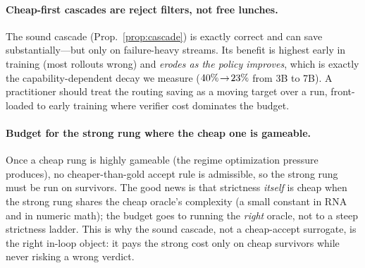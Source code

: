\paragraph{Cheap-first cascades are reject filters, not free lunches.} The sound cascade
(Prop.~\ref{prop:cascade}) is exactly correct and can save substantially---but only on failure-heavy streams.
Its benefit is highest early in training (most rollouts wrong) and \emph{erodes as the policy improves}, which
is exactly the capability-dependent decay we measure ($40\%\!\to\!23\%$ from 3B to
7B). A practitioner should treat the routing saving as a moving target over a run, front-loaded to early
training where verifier cost dominates the budget.

\paragraph{Budget for the strong rung where the cheap one is gameable.} Once a cheap rung is highly gameable
(the regime optimization pressure produces), no cheaper-than-gold accept rule is admissible, so the strong
rung must be run on survivors. The good news is that strictness \emph{itself} is cheap when the strong rung
shares the cheap oracle's complexity (a small constant in RNA and in numeric math); the budget goes to running
the \emph{right} oracle, not to a steep strictness ladder. This is why the sound cascade, not a cheap-accept
surrogate, is the right in-loop object: it pays the strong cost only on cheap survivors while never risking a
wrong verdict.

